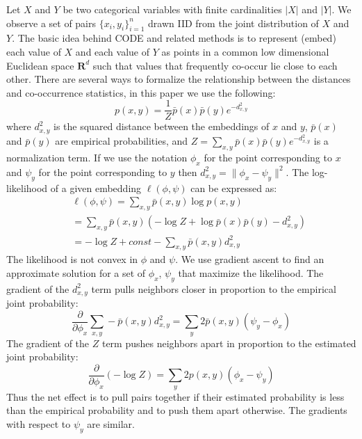Let $X$ and $Y$ be two categorical variables with finite cardinalities
$|X|$ and $|Y|$.  We observe a set of pairs $\{x_i, y_i\}_{i=1}^n$
drawn IID from the joint distribution of $X$ and $Y$.  The basic idea
behind CODE and related methods is to represent (embed) each value of
$X$ and each value of $Y$ as points in a common low dimensional
Euclidean space $\mathbf{R}^d$ such that values that frequently
co-occur lie close to each other.  There are several ways to formalize
the relationship between the distances and co-occurrence statistics, in
this paper we use the following:
\begin{equation} \label{eq:probability}
p(x,y) = \frac{1}{Z} \bar{p}(x) \bar{p}(y) e^{-d^2_{x,y}}
\end{equation}
\noindent where $d^2_{x,y}$ is the squared distance between the
embeddings of $x$ and $y$, $\bar{p}(x)$ and $\bar{p}(y)$ are empirical
probabilities, and $Z=\sum_{x,y} \bar{p}(x) \bar{p}(y) e^{-d^2_{x,y}}$ is
a normalization term.  If we use the notation $\phi_x$ for the
point corresponding to $x$ and $\psi_y$ for the point corresponding
to $y$ then $d^2_{x,y} = \|\phi_x-\psi_y\|^2$.  The log-likelihood
of a given embedding $\ell(\phi, \psi)$ can be expressed as:
\begin{eqnarray} 
&&\ell(\phi, \psi) = \sum_{x,y} \bar{p}(x,y) \log p(x,y) \label{eq:likelihood} \\
&&= \sum_{x,y} \bar{p}(x,y) (-\log Z + \log \bar{p}(x)\bar{p}(y) - d^2_{x,y}) \nonumber \\
&&= -\log Z + \mathit{const} - \sum_{x,y} \bar{p}(x,y) d^2_{x,y} \nonumber
\end{eqnarray}
The likelihood is not convex in $\phi$ and $\psi$.  We use gradient
ascent to find an approximate solution for a set of $\phi_x$, $\psi_y$
that maximize the likelihood.  The gradient of the $d^2_{x,y}$ term
pulls neighbors closer in proportion to the empirical joint
probability:
\begin{equation}
\frac{\partial}{\partial\phi_x} \sum_{x,y} -\bar{p}(x,y) d^2_{x,y} =
\sum_y 2 \bar{p}(x,y) (\psi_y - \phi_x) \label{eq:attract}
\end{equation}
The gradient of the $Z$ term pushes neighbors apart in proportion to the
estimated joint probability:
\begin{equation}
\frac{\partial}{\partial\phi_x} (-\log Z) = \sum_y 2 p(x,y) (\phi_x -
\psi_y) \label{eq:repulse}
\end{equation}
Thus the net effect is to pull pairs together if their estimated
probability is less than the empirical probability and to push them
apart otherwise.  The gradients with respect to $\psi_y$ are
similar.

